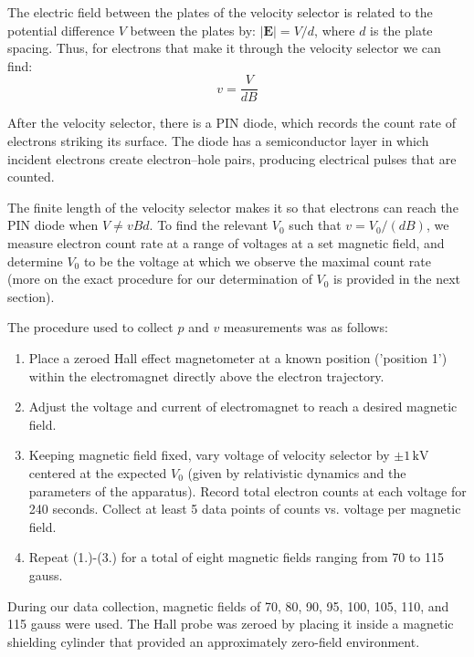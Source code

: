 The electric field between the plates of the velocity selector is related to the
potential difference $V$ between the plates by: $|\bm{E}|=V/d$, where $d$ is the plate spacing. Thus, for electrons that
make it through the velocity selector we can find:
$$v=\frac{V}{dB}$$

After the velocity selector, there is a PIN diode, which records the count rate of electrons striking its surface. The diode has a semiconductor layer in which incident electrons
create electron--hole pairs, producing electrical pulses that
are counted.



The finite length of the velocity selector makes it so that electrons can reach the PIN diode when $V \neq vBd$. To find the relevant
$V_0$ such that $v=V_0/(dB)$, we measure electron count rate at a range of voltages at a set magnetic field, and determine $V_0$ to be the
voltage at which we observe the maximal count rate (more on the exact procedure for our determination of $V_0$ is provided in the next section).



The procedure used to collect $p$ and $v$ measurements was as follows:
\begin{enumerate}
\item  Place a zeroed Hall effect magnetometer at a known position ('position 1') within the electromagnet directly above the electron trajectory.
\item  Adjust the voltage and current of electromagnet to reach a desired magnetic field.
\item  Keeping magnetic field fixed, vary voltage of velocity selector by $\pm1\,\mathrm{kV}$ centered at the expected
$V_0$ (given by relativistic dynamics and the parameters of the apparatus). Record total electron counts at each voltage for 240 seconds. Collect
at least 5 data points of counts vs. voltage per magnetic field.
\item Repeat (1.)-(3.) for a total of eight magnetic fields ranging from 70 to 115 gauss.
\end{enumerate}
During our data collection, magnetic fields of 70, 80, 90, 95, 100, 105, 110, and 115 gauss were used. The Hall probe was zeroed by placing it inside a magnetic shielding
cylinder that provided an approximately zero-field environment.


